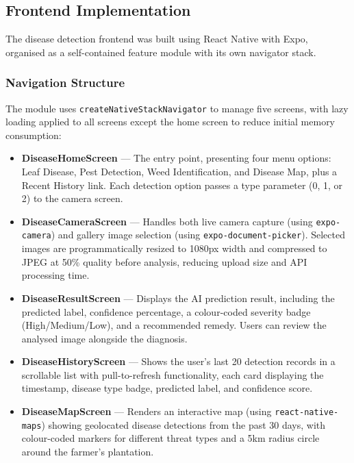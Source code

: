 \subsection{Frontend Implementation}

The disease detection frontend was built using React Native with Expo, organised as a self-contained feature module with its own navigator stack.

\subsubsection{Navigation Structure}

The module uses \texttt{createNativeStackNavigator} to manage five screens, with lazy loading applied to all screens except the home screen to reduce initial memory consumption:

\begin{itemize}
    \item \textbf{DiseaseHomeScreen} --- The entry point, presenting four menu options: Leaf Disease, Pest Detection, Weed Identification, and Disease Map, plus a Recent History link. Each detection option passes a type parameter (0, 1, or 2) to the camera screen.
    \item \textbf{DiseaseCameraScreen} --- Handles both live camera capture (using \texttt{expo-camera}) and gallery image selection (using \texttt{expo-document-picker}). Selected images are programmatically resized to 1080px width and compressed to JPEG at 50\% quality before analysis, reducing upload size and API processing time.
    \item \textbf{DiseaseResultScreen} --- Displays the AI prediction result, including the predicted label, confidence percentage, a colour-coded severity badge (High/Medium/Low), and a recommended remedy. Users can review the analysed image alongside the diagnosis.
    \item \textbf{DiseaseHistoryScreen} --- Shows the user's last 20 detection records in a scrollable list with pull-to-refresh functionality, each card displaying the timestamp, disease type badge, predicted label, and confidence score.
    \item \textbf{DiseaseMapScreen} --- Renders an interactive map (using \texttt{react-native-maps}) showing geolocated disease detections from the past 30 days, with colour-coded markers for different threat types and a 5km radius circle around the farmer's plantation.
\end{itemize}

